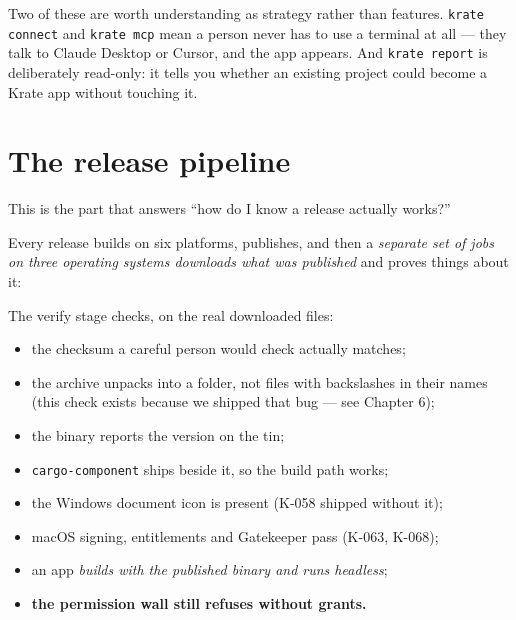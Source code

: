 \documentclass[11pt,a4paper]{report}
\begin{document}
Two of these are worth understanding as strategy rather than features.
\texttt{krate connect} and \texttt{krate mcp} mean a person never has to
use a terminal at all --- they talk to Claude Desktop or Cursor, and the app
appears. And \texttt{krate report} is deliberately read-only: it tells you
whether an existing project could become a Krate app without touching it.

\section{The release pipeline}

This is the part that answers ``how do I know a release actually works?''

Every release builds on six platforms, publishes, and then a \emph{separate
set of jobs on three operating systems downloads what was published} and
proves things about it:

\begin{center}
\end{center}

The verify stage checks, on the real downloaded files:

\begin{itemize}[leftmargin=*]
  \item the checksum a careful person would check actually matches;
  \item the archive unpacks into a folder, not files with backslashes in
    their names (this check exists because we shipped that bug --- see
    Chapter 6);
  \item the binary reports the version on the tin;
  \item \texttt{cargo-component} ships beside it, so the build path works;
  \item the Windows document icon is present (K-058 shipped without it);
  \item macOS signing, entitlements and Gatekeeper pass (K-063, K-068);
  \item an app \emph{builds with the published binary and runs headless};
  \item \textbf{the permission wall still refuses without grants.}
\end{itemize}
\end{document}
